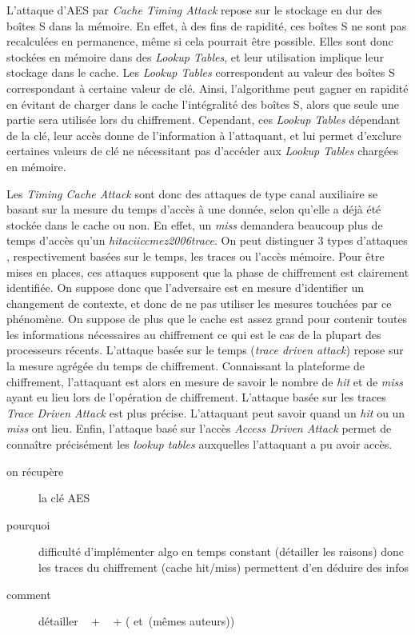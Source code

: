 \documentclass[a4paper,11pt]{article}
\begin{document}
L'attaque d'AES par \emph{Cache Timing Attack} repose sur le stockage en dur des boîtes S dans la mémoire. En effet, à des fins de rapidité, ces boîtes S ne sont pas recalculées en permanence, même si cela pourrait être possible. Elles sont donc stockées en mémoire dans des \emph{Lookup Tables}, et leur utilisation implique leur stockage dans le cache. Les \emph{Lookup Tables} correspondent au valeur des boîtes S correspondant à certaine valeur de clé. Ainsi, l'algorithme peut gagner en rapidité en évitant de charger dans le cache l'intégralité des boîtes S, alors que seule une partie sera utilisée lors du chiffrement. Cependant, ces \emph{Lookup Tables} dépendant de la clé, leur accès donne de l'information à l'attaquant, et lui permet d'exclure certaines valeurs de clé ne nécessitant pas d'accéder aux \emph{Lookup Tables} chargées en mémoire.


Les \emph{Timing Cache Attack} sont donc des attaques de type canal auxiliaire se basant sur la mesure du temps d'accès à une donnée, selon qu'elle a déjà été stockée dans le cache ou non. En effet, un \emph{miss} demandera beaucoup plus de temps d'accès qu'un \emph{hitaciiccmez2006trace}. On peut distinguer 3 types d'attaques \cite{aciiccmez2006trace}, respectivement basées sur le temps, les traces ou l'accès mémoire.
Pour être mises en places, ces attaques supposent que la phase de chiffrement est clairement identifiée. On suppose donc que l'adversaire est en mesure d'identifier un changement de contexte, et donc de ne pas utiliser les mesures touchées par ce phénomène. On suppose de plus que le cache est assez grand pour contenir toutes les informations nécessaires au chiffrement ce qui est le cas de la plupart des processeurs récents.
L'attaque basée sur le temps (\emph{trace driven attack}) repose sur la mesure agrégée du temps de chiffrement. Connaissant la plateforme de chiffrement, l'attaquant est alors en mesure de savoir le nombre de \emph{hit} et de \emph{miss} ayant eu lieu lors de l'opération de chiffrement.
L'attaque basée sur les traces \emph{Trace Driven Attack} est plus précise. L'attaquant peut savoir quand un \emph{hit} ou un \emph{miss} ont lieu.
Enfin, l'attaque basé sur l'accès \emph{Access Driven Attack} permet de connaître précisément les \emph{lookup tables} auxquelles l'attaquant a pu avoir accès.
 

\begin{description}
\item[on récupère] la clé AES
\item[pourquoi] difficulté d'implémenter algo en temps constant (détailler les raisons) donc les traces du chiffrement (cache hit/miss) permettent d'en déduire des infos
\item[comment] détailler  ~\cite{canteaut2006understanding} + ~\cite{bernstein2005cache} + (\cite{tromer2010efficient} et~\cite{osvik2006cache}(mêmes auteurs))
\end{description}
\end{document}
